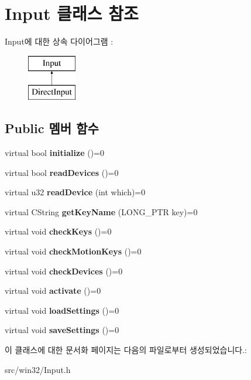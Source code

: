 \hypertarget{class_input}{}\section{Input 클래스 참조}
\label{class_input}
Input에 대한 상속 다이어그램 \+: \begin{figure}[H]
\begin{center}
\leavevmode
\includegraphics[height=2.000000cm]{class_input}
\end{center}
\end{figure}
\subsection*{Public 멤버 함수}
\begin{DoxyCompactItemize}
\item 
\mbox{\label{class_input_affd45f0c278a6ff71b7ae1a567a3dc1c}} 
virtual bool {\bfseries initialize} ()=0
\item 
\mbox{\label{class_input_a422dbf7bc783378d47eddec93d1f565a}} 
virtual bool {\bfseries read\+Devices} ()=0
\item 
\mbox{\label{class_input_a57a47977bda8fcf6de237401b4c2e0dd}} 
virtual u32 {\bfseries read\+Device} (int which)=0
\item 
\mbox{\label{class_input_a2c4ec8a744b040657e220480987cd8bf}} 
virtual C\+String {\bfseries get\+Key\+Name} (L\+O\+N\+G\+\_\+\+P\+TR key)=0
\item 
\mbox{\label{class_input_a91418a5762e6e50aa4f59e4ce92d2dfa}} 
virtual void {\bfseries check\+Keys} ()=0
\item 
\mbox{\label{class_input_aac8f25a1a6a7e0bd54e5d50b9b774844}} 
virtual void {\bfseries check\+Motion\+Keys} ()=0
\item 
\mbox{\label{class_input_a7a6ef57ff2638f545380618b2d3fdf9d}} 
virtual void {\bfseries check\+Devices} ()=0
\item 
\mbox{\label{class_input_a5917709c5d9cf1270d430667982895d1}} 
virtual void {\bfseries activate} ()=0
\item 
\mbox{\label{class_input_a098708c062b906c84ab036c04d447a29}} 
virtual void {\bfseries load\+Settings} ()=0
\item 
\mbox{\label{class_input_a90c42a9d91bf671aaee3d5f611199eec}} 
virtual void {\bfseries save\+Settings} ()=0
\end{DoxyCompactItemize}


이 클래스에 대한 문서화 페이지는 다음의 파일로부터 생성되었습니다.\+:\begin{DoxyCompactItemize}
\item 
src/win32/Input.\+h\end{DoxyCompactItemize}

